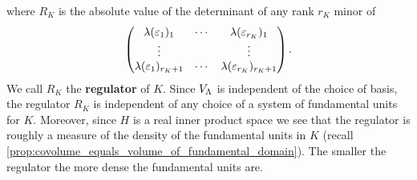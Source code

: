     where $R_{K}$ is the absolute value of the determinant of any rank $r_{K}$ minor of
    \[
      \begin{pmatrix} \lambda(\varepsilon_{1})_{1} & \cdots & \lambda(\varepsilon_{r_{K}})_{1} \\ \vdots & & \vdots \\ \lambda(\varepsilon_{1})_{r_{K}+1} & \cdots & \lambda(\varepsilon_{r_{K}})_{r_{K}+1}  \end{pmatrix}.
    \]
    We call $R_{K}$ the \textbf{regulator} of $K$. Since $V_{\Lambda}$ is independent of the choice of basis, the regulator $R_{K}$ is independent of any choice of a system of fundamental units for $K$. Moreover, since $H$ is a real inner product space we see that the regulator is roughly a measure of the density of the fundamental units in $K$ (recall \cref{prop:covolume_equals_volume_of_fundamental_domain}). The smaller the regulator the more dense the fundamental units are.